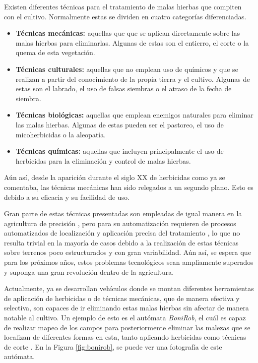Existen diferentes técnicas para el tratamiento de malas hierbas que compiten con el cultivo. Normalmente estas se dividen en cuatro categorías diferenciadas.

\begin{itemize}

    \item \textbf{Técnicas mecánicas:} aquellas que que se aplican directamente sobre las malas hierbas para eliminarlas. Algunas de estas son el entierro, el corte o la quema de esta vegetación.
    
    \item \textbf{Técnicas culturales:} aquellas que no emplean uso de químicos y que se realizan a partir del conocimiento de la propia tierra y el cultivo. Algunas de estas son el labrado, el uso de falsas siembras o el atraso de la fecha de siembra.
    
    \item \textbf{Técnicas biológicas:} aquellas que emplean enemigos naturales para eliminar las malas hierbas. Algunas de estas pueden ser el pastoreo, el uso de micoherbicidas o la aleopatía.
    
    \item \textbf{Técnicas químicas:} aquellas que incluyen principalmente el uso de herbicidas para la eliminación y control de malas hierbas.
    
\end{itemize}

Aún así, desde la aparición durante el siglo XX de herbicidas como ya se comentaba, las técnicas mecánicas han sido relegados a un segundo plano. Esto es debido a su eficacia y su facilidad de uso.

Gran parte de estas técnicas presentadas son empleadas de igual manera en la agricultura de precisión \cite{Weis2008}, pero para su automatización requieren de procesos automatizados de localización y aplicación precisa del tratamiento \cite{Westwood2018}, lo que no resulta trivial en la mayoría de casos debido a la realización de estas técnicas sobre terrenos poco estructurados y con gran variabilidad. Aún así, se espera que para los próximos años, estos problemas tecnológicos sean ampliamente superados y suponga una gran revolución dentro de la agricultura.

Actualmente, ya se desarrollan vehículos donde se montan diferentes herramientas de aplicación de herbicidas o de técnicas mecánicas, que de manera efectiva y selectiva, son capaces de ir eliminando estas malas hierbas sin afectar de manera notable al cultivo. Un ejemplo de esto es el autómata \textit{BoniRob}, el cuál es capaz de realizar mapeo de los campos para posteriormente eliminar las malezas que se localizan de diferentes formas en esta, tanto aplicando herbicidas \cite{Scholz2014} como técnicas de corte \cite{EvanAckerman2021}. En la Figura \ref{fig:bonirob}, se puede ver una fotografía de este autómata.

